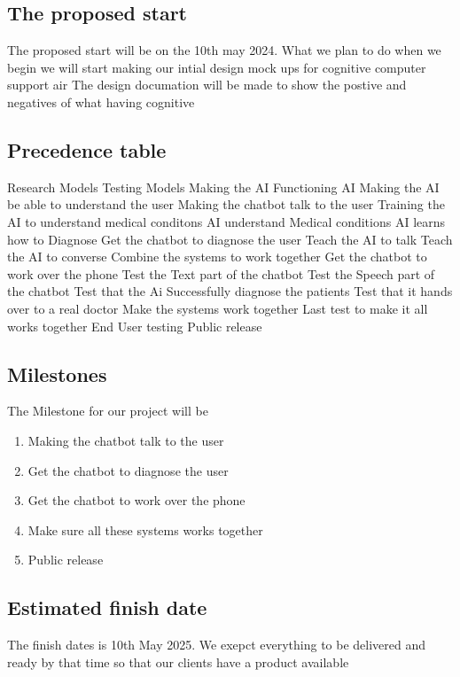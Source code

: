 \documentclass{article}
\begin{document}
\subsection{The proposed start}
The proposed start will be on the 10th may 2024. What we plan to do when we begin we will start making our intial design mock ups for cognitive computer support air
The design documation will be made to show the postive and negatives of what having cognitive 

\subsection{Precedence table}
Research Models
Testing Models
Making the AI
Functioning AI
Making the AI be able to understand the user
Making the chatbot talk to the user
Training the AI to understand medical conditons
AI understand Medical conditions
AI learns how to Diagnose
Get the chatbot to diagnose the user
Teach the AI to talk
Teach the AI to converse
Combine the systems to work together 
Get the chatbot to work over the phone
Test the Text part of the chatbot
Test the Speech part of the chatbot
Test that the Ai Successfully diagnose the patients
Test that it hands over to a real doctor
Make the systems work together
Last test to make it all works together
End User testing
Public release 


\subsection{Milestones}
The Milestone for our project will be 
	\begin{enumerate}
		\item Making the chatbot talk to the user
		\item Get the chatbot to diagnose the user
		\item Get the chatbot to work over the phone
		\item Make sure all these systems works together
		\item Public release
	\end{enumerate}

\subsection{Estimated finish date}

The finish dates is 10th May 2025. We exepct everything to be delivered and ready by that time so that our clients have a product available 
\end{document}
